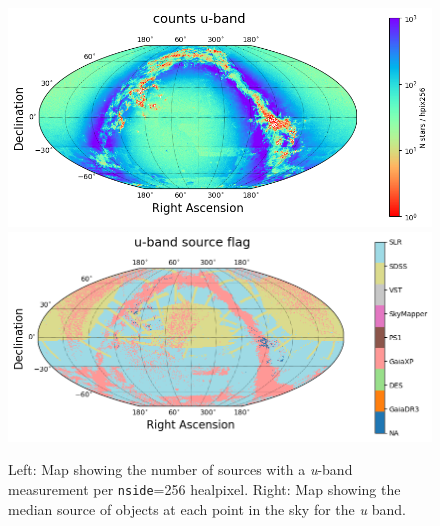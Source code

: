 \begin{figure}
    \includegraphics[width=0.48\linewidth]{./figures/source_density_maps/u-band_counts_full.png}
    \includegraphics[width=0.48\linewidth]{./figures/source_survey_maps/u-band_source.png}
    \caption{Left: Map showing the number of sources with a \textit{u}-band measurement per \texttt{nside}=256 healpixel.
    Right: Map showing the median source of objects at each point in the sky for the \textit{u} band.}
    \label{fig:monster-u}
\end{figure}

